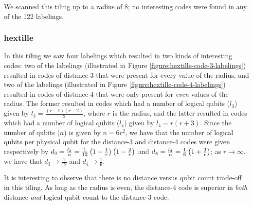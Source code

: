 \documentclass[twocolumn,showpacs,preprintnumbers,amsmath,amssymb,nofootinbib,pra,floatfix]{revtex4-1}
\begin{document}
We scanned this tiling up to a radius of 8;  no interesting codes were found in any of the 122 labelings.
\subsubsection{hextille}

In this tiling we saw four labelings which resulted in two kinds of interesting codes:  two of the labelings (illustrated in Figure \ref{figure:hextille-code-3-labelings}) resulted in codes of distance 3 that were present for every value of the radius, and two of the labelings (illustrated in Figure \ref{figure:hextille-code-4-labelings}) resulted in codes of distance 4 that were only present for \emph{even} values of the radius.  The former resulted in codes which had a number of logical qubits ($l_3$) given by $l_3=\frac{(r-1)(r-2)}{2}$, where $r$ is the radius, and the latter resulted in codes which had a number of logical qubits ($l_4$) given by $l_4=r(r+3)$.  Since the number of qubits ($n$) is given by $n=6r^2$, we have that the number of logical qubits per physical qubit for the distance-3 and distance-4 codes were given respectively by $d_3=\frac{l_3}{n}=\frac{1}{12}\left(1-\frac{1}{r}\right)\left(1-\frac{2}{r}\right)$ and $d_4=\frac{l_4}{n}=\frac{1}{6}\left(1+\frac{3}{r}\right)$;  as $r\to\infty$, we have that $d_3\to\frac{1}{12}$ and $d_4\to\frac{1}{6}$.

It is interesting to observe that there is no distance versus qubit count trade-off in this tiling.  As long as the radius is even, the distance-4 code is superior in \emph{both} distance \emph{and} logical qubit count to the distance-3 code.
\end{document}
